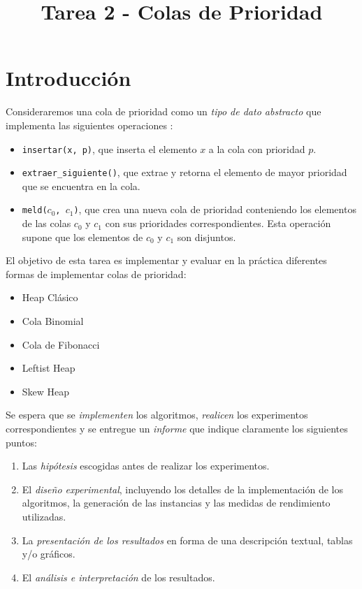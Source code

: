 \documentclass[dcc,uchile]{fcfmcourse}
\title{Tarea 2 - Colas de Prioridad}
\begin{document}
\captionsetup[table]{name=Tabla}
\captionsetup[table]{name=Figura}

\maketitle
\vspace{-1ex}
\section{Introducción}
Consideraremos una cola de prioridad como un \textit{tipo de dato abstracto} que implementa las siguientes operaciones :
\begin{itemize}
    \item \texttt{insertar(x, p)}, que inserta el elemento $x$ a la cola con prioridad $p$.
    \item \texttt{extraer\_siguiente()}, que extrae y retorna el elemento de mayor prioridad que se encuentra en la cola.
    \item \texttt{meld($c_{0}$, $c_{1}$)}, que crea una nueva cola de prioridad conteniendo los elementos de las colas $c_{0}$ y $c_{1}$ con sus prioridades correspondientes. Esta operación supone que los elementos de $c_{0}$ y $c_{1}$ son disjuntos.
\end{itemize}
El objetivo de esta tarea es implementar y evaluar en la práctica diferentes formas de implementar colas de prioridad:
\begin{itemize}
    \item Heap Clásico
    \item Cola Binomial
    \item Cola de Fibonacci
    \item Leftist Heap
    \item Skew Heap
\end{itemize}

Se espera que se \textit{implementen} los algoritmos, \textit{realicen} los experimentos correspondientes y se entregue un \textit{informe} que indique claramente los siguientes puntos:
\begin{enumerate}[1.]
    \item Las \textit{hipótesis} escogidas antes de realizar los experimentos.
    \item El \textit{diseño experimental}, incluyendo los detalles de la implementación de los algoritmos, la generación de las instancias y las medidas de rendimiento utilizadas.
    \item La \textit{presentación de los resultados} en forma de una descripción textual, tablas y/o gráficos.
    \item El \textit{análisis e interpretación} de los resultados.
\end{enumerate}
\end{document}
